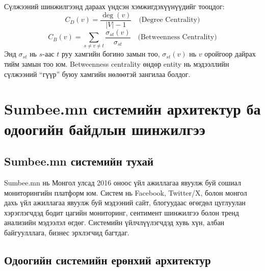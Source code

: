 Сүлжээний шинжилгээнд дараах үндсэн хэмжигдэхүүнүүдийг тооцдог:
\begin{equation}
    C_D(v) = \frac{\deg(v)}{|V| - 1} \quad \text{(Degree Centrality)}
\end{equation}
\begin{equation}
    C_B(v) = \sum_{s \neq v \neq t} \frac{\sigma_{st}(v)}{\sigma_{st}} \quad \text{(Betweenness Centrality)}
\end{equation}
Энд $\sigma_{st}$ нь $s$-аас $t$ руу хамгийн богино замын тоо, $\sigma_{st}(v)$ нь $v$ оройгоор дайрах тийм замын тоо юм. Betweenness centrality өндөр entity нь мэдээллийн сүлжээний ``гүүр'' буюу хамгийн нөлөөтэй зангилаа болдог.

\section{Sumbee.mn системийн архитектур ба одоогийн байдлын шинжилгээ}

\subsection{Sumbee.mn системийн тухай}

Sumbee.mn нь Монгол улсад 2016 оноос үйл ажиллагаа явуулж буй сошиал мониторингийн платформ юм. Систем нь Facebook, Twitter/X, болон монгол дахь үйл ажиллагаа явуулж буй мэдээний сайт, блогуудаас өгөгдөл цуглуулан хэрэглэгчдэд бодит цагийн мониторинг, сентимент шинжилгээ болон тренд анализийн мэдээлэл өгдөг. Системийн үйлчлүүлэгчдэд хувь хүн, албан байгуулллага, бизнес эрхлэгчид багтдаг.

\subsection{Одоогийн системийн ерөнхий архитектур}

